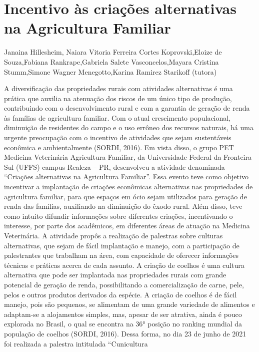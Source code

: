 

\section{Incentivo às criações alternativas na Agricultura Familiar}

Janaina Hillesheim, Naiara Vitoria Ferreira Cortes Koprovski,Eloize de Souza,Fabiana Rankrape,Gabriela Salete Vasconcelos,Mayara Cristina Stumm,Simone Wagner Menegotto,Karina Ramirez Starikoff (tutora)

A diversificação das propriedades rurais com atividades alternativas é uma prática que
auxilia na atenuação dos riscos de um único tipo de produção, contribuindo com o
desenvolvimento rural e com a garantia de geração de renda às famílias de agricultura familiar.
Com o atual crescimento populacional, diminuição de residentes do campo e o uso errôneo dos
recursos naturais, há uma urgente preocupação com o incentivo de atividades que sejam
sustentáveis econômica e ambientalmente (SORDI, 2016).
Em vista disso, o grupo PET Medicina Veterinária Agricultura Familiar, da Universidade
Federal da Fronteira Sul (UFFS) campus Realeza – PR, desenvolveu a atividade denominada
“Criações alternativas na Agricultura Familiar”. Essa evento teve como objetivo incentivar a
implantação de criações econômicas alternativas nas propriedades de agricultura familiar, para
que espaços em ócio sejam utilizados para geração de renda das famílias, auxiliando na
diminuição do êxodo rural. Além disso, teve como intuito difundir informações sobre diferentes
criações, incentivando o interesse, por parte dos acadêmicos, em diferentes áreas de atuação na
Medicina Veterinária.
A atividade propôs a realização de palestras sobre culturas alternativas, que sejam de fácil
implantação e manejo, com a participação de palestrantes que trabalham na área, com capacidade
de oferecer informações técnicas e práticas acerca de cada assunto.
A criação de coelhos é uma cultura alternativa que pode ser implantada nas propriedades
rurais com grande potencial de geração de renda, possibilitando a comercialização de carne, pele,
pelos e outros produtos derivados da espécie. A criação de coelhos é de fácil manejo, pois são
pequenos, se alimentam de uma grande variedade de alimentos e adaptam-se a alojamentos
simples, mas, apesar de ser atrativa, ainda é pouco explorada no Brasil, o qual se encontra na 36°
posição no ranking mundial da população de coelhos (SORDI, 2016).
Dessa forma, no dia 23 de junho de 2021 foi realizada a palestra intitulada “Cunicultura
